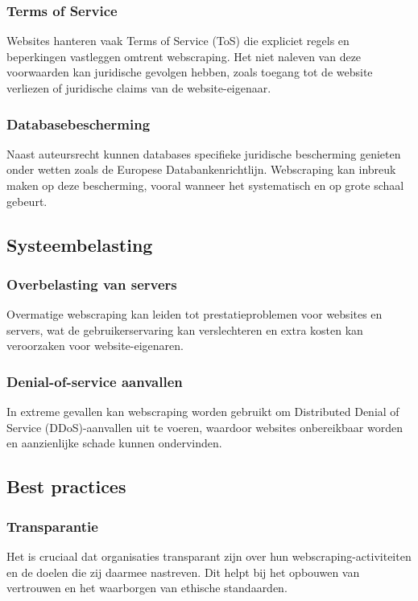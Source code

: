 \subsubsection{Terms of Service}
Websites hanteren vaak Terms of Service (ToS) die expliciet regels en beperkingen vastleggen omtrent webscraping. Het niet naleven van deze voorwaarden kan juridische gevolgen hebben, zoals toegang tot de website verliezen of juridische claims van de website-eigenaar.

\subsubsection{Databasebescherming}
Naast auteursrecht kunnen databases specifieke juridische bescherming genieten onder wetten zoals de Europese Databankenrichtlijn. Webscraping kan inbreuk maken op deze bescherming, vooral wanneer het systematisch en op grote schaal gebeurt.

\subsection{Systeembelasting}
\subsubsection{Overbelasting van servers}
Overmatige webscraping kan leiden tot prestatieproblemen voor websites en servers, wat de gebruikerservaring kan verslechteren en extra kosten kan veroorzaken voor website-eigenaren.

\subsubsection{Denial-of-service aanvallen}
In extreme gevallen kan webscraping worden gebruikt om Distributed Denial of Service (DDoS)-aanvallen uit te voeren, waardoor websites onbereikbaar worden en aanzienlijke schade kunnen ondervinden.

\subsection{Best practices}
\subsubsection{Transparantie}
Het is cruciaal dat organisaties transparant zijn over hun webscraping-activiteiten en de doelen die zij daarmee nastreven. Dit helpt bij het opbouwen van vertrouwen en het waarborgen van ethische standaarden.

